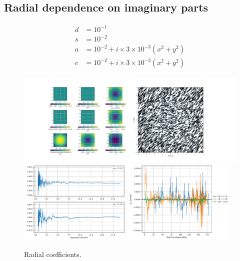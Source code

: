 \newpage
\subsection{Radial dependence on imaginary parts}

\begin{align}
d &= 10^{-1} \\
s &= 10^{-2} \\
a &= 10^{-2} + i \times 3 \times 10^{-3} (x^2+y^2) \\
c &= 10^{-2} + i \times 3 \times 10^{-3} (x^2+y^2)
\end{align}

\begin{figure}[h]
\centering
\includegraphics[width=\textwidth]{figs/20230109_radial_imag/coeff_shear.pdf}
\includegraphics[width=0.48\textwidth]{figs/20230109_radial_imag/2point.pdf}
\includegraphics[width=0.48\textwidth]{figs/20230109_radial_imag/3point.pdf}
\caption{Radial coefficients.}
\label{fig:radial}
\end{figure}
